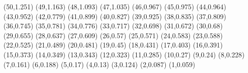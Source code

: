 (50,1.251)
(49,1.163)
(48,1.093)
(47,1.035)
(46,0.967)
(45,0.975)
(44,0.964)
(43,0.952)
(42,0.779)
(41,0.899)
(40,0.827)
(39,0.925)
(38,0.835)
(37,0.809)
(36,0.745)
(35,0.781)
(34,0.776)
(33,0.717)
(32,0.698)
(31,0.672)
(30,0.68)
(29,0.655)
(28,0.637)
(27,0.609)
(26,0.57)
(25,0.571)
(24,0.583)
(23,0.588)
(22,0.525)
(21,0.489)
(20,0.481)
(19,0.45)
(18,0.431)
(17,0.403)
(16,0.391)
(15,0.373)
(14,0.349)
(13,0.343)
(12,0.323)
(11,0.285)
(10,0.27)
(9,0.24)
(8,0.228)
(7,0.161)
(6,0.188)
(5,0.17)
(4,0.13)
(3,0.124)
(2,0.087)
(1,0.059)
